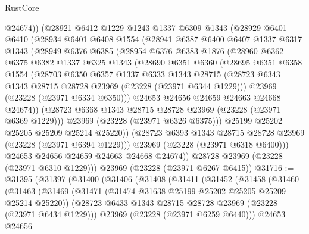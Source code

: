 \begin{lexlean}{RustCore}
\begin{coremodule}
        @24674))
    (@28921
      @6412
      @1229
      @1243
      @1337
      @6309
      @1343
      (@28929
        @6401
        @6410
        (@28934
          @6401
          @6408
          @1554
          (@28941
            @6387
            @6400
            @6407
            @1337
            @6317
            @1343
            (@28949
              @6376
              @6385
              (@28954
                @6376
                @6383
                @1876
                (@28960
                  @6362
                  @6375
                  @6382
                  @1337
                  @6325
                  @1343
                  (@28690
                    @6351
                    @6360
                    (@28695
                      @6351
                      @6358
                      @1554
                      (@28703
                        @6350
                        @6357
                        @1337
                        @6333
                        @1343
                        @28715
                        (@28723 @6343 @1343 @28715 @28728 @23969 (@23228 (@23971 @6344 @1229)))
                        @23969
                        (@23228 (@23971 @6334 @6350)))
                      @24653
                      @24656
                      @24659
                      @24663
                      @24668
                      @24674))
                  (@28723 @6368 @1343 @28715 @28728 @23969 (@23228 (@23971 @6369 @1229)))
                  @23969
                  (@23228 (@23971 @6326 @6375)))
                @25199
                @25202
                @25205
                @25209
                @25214
                @25220))
            (@28723 @6393 @1343 @28715 @28728 @23969 (@23228 (@23971 @6394 @1229)))
            @23969
            (@23228 (@23971 @6318 @6400)))
          @24653
          @24656
          @24659
          @24663
          @24668
          @24674))
      @28728
      @23969
      (@23228 (@23971 @6310 @1229)))
    @23969
    (@23228 (@23971 @6267 @6415))
@31716 := @31395
    (@31397
      (@31400
        (@31406
          (@31408
            (@31411
              (@31452
                (@31458
                  (@31460
                    (@31463
                      (@31469
                        (@31471 (@31474 @31638 @25199 @25202 @25205 @25209 @25214 @25220))
                        (@28723 @6433 @1343 @28715 @28728 @23969 (@23228 (@23971 @6434 @1229)))
                        @23969
                        (@23228 (@23971 @6259 @6440)))
                      @24653
                      @24656

\end{coremodule}
\end{lexlean}
